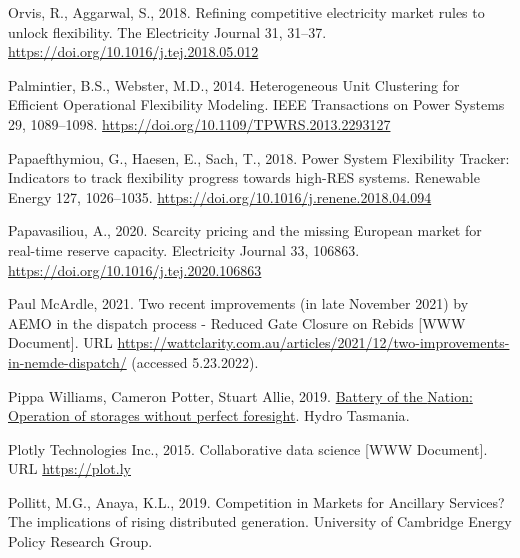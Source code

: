 \documentclass[12pt,a4paper,]{report}
\newlength{\cslhangindent}
\newenvironment{CSLReferences}[2] %
 {%
  \setlength{\parindent}{0pt}
  \ifodd #1 \everypar{\setlength{\hangindent}{\cslhangindent}}\ignorespaces\fi
  \ifnum #2 > 0
  \setlength{\parskip}{#2\baselineskip}
  \fi
 }%
 {}
\begin{document}
\begin{CSLReferences}{1}{0}
\leavevmode{}%
Orvis, R., Aggarwal, S., 2018. Refining competitive electricity market
rules to unlock flexibility. The Electricity Journal 31, 31--37.
\url{https://doi.org/10.1016/j.tej.2018.05.012}

\leavevmode{}%
Palmintier, B.S., Webster, M.D., 2014. Heterogeneous {Unit Clustering}
for {Efficient Operational Flexibility Modeling}. IEEE Transactions on
Power Systems 29, 1089--1098.
\url{https://doi.org/10.1109/TPWRS.2013.2293127}

\leavevmode{}%
Papaefthymiou, G., Haesen, E., Sach, T., 2018. Power {System Flexibility
Tracker}: {Indicators} to track flexibility progress towards high-{RES}
systems. Renewable Energy 127, 1026--1035.
\url{https://doi.org/10.1016/j.renene.2018.04.094}

\leavevmode{}%
Papavasiliou, A., 2020. Scarcity pricing and the missing {European}
market for real-time reserve capacity. Electricity Journal 33, 106863.
\url{https://doi.org/10.1016/j.tej.2020.106863}

\leavevmode{}%
Paul McArdle, 2021. Two recent improvements (in late {November} 2021) by
{AEMO} in the dispatch process - {Reduced Gate Closure} on {Rebids}
{[}WWW Document{]}. URL
\url{https://wattclarity.com.au/articles/2021/12/two-improvements-in-nemde-dispatch/}
(accessed 5.23.2022).

\leavevmode{}%
Pippa Williams, Cameron Potter, Stuart Allie, 2019.
\href{https://www.hydro.com.au/docs/default-source/clean-energy/battery-of-the-nation/storage-with-imperfect-foresight.pdf?sfvrsn=72e59528_4}{Battery
of the {Nation}: {Operation} of storages without perfect foresight}.
{Hydro Tasmania}.

\leavevmode{}%
Plotly Technologies Inc., 2015. Collaborative data science {[}WWW
Document{]}. URL \url{https://plot.ly}

\leavevmode{}%
Pollitt, M.G., Anaya, K.L., 2019. Competition in {Markets} for
{Ancillary Services}? {The} implications of rising distributed
generation. {University of Cambridge Energy Policy Research Group}.


\end{CSLReferences}
\end{document}
